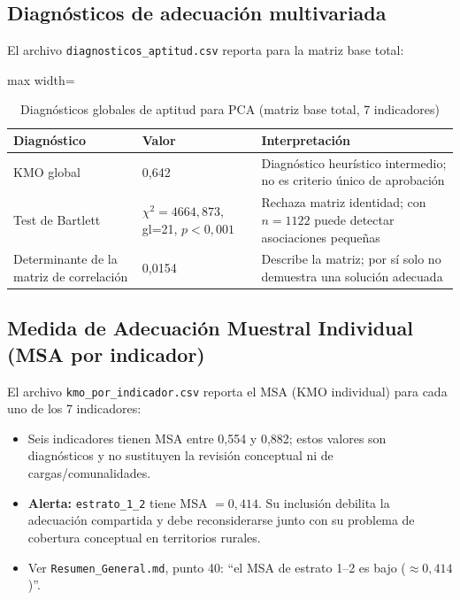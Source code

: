 \subsection{Diagnósticos de adecuación multivariada}
\label{sec:diagnosticos_aptitud}

El archivo \texttt{diagnosticos\_aptitud.csv} reporta para la matriz base total:

\begin{table}[htbp]
\centering
\caption{Diagnósticos globales de aptitud para PCA (matriz base total, 7 indicadores)}
\label{tab:diagnosticos_aptitud}
\begin{adjustbox}{max width=\textwidth}
\begin{tabular}{@{}lll@{}}
\toprule
\textbf{Diagnóstico} & \textbf{Valor} & \textbf{Interpretación} \\
\midrule
KMO global & 0,642 & Diagnóstico heurístico intermedio; no es criterio único de aprobación \\
Test de Bartlett & $\chi^2 = 4664,873$, gl=21, $p < 0,001$ & Rechaza matriz identidad; con $n=1122$ puede detectar asociaciones pequeñas \\
Determinante de la matriz de correlación & 0,0154 & Describe la matriz; por sí solo no demuestra una solución adecuada \\
\bottomrule
\end{tabular}
\end{adjustbox}
\end{table}

\subsection{Medida de Adecuación Muestral Individual (MSA por indicador)}
\label{sec:msa_individual}

El archivo \texttt{kmo\_por\_indicador.csv} reporta el MSA (KMO individual) para cada uno de los 7 indicadores:

\begin{itemize}
    \item Seis indicadores tienen MSA entre 0,554 y 0,882; estos valores son diagnósticos y no sustituyen la revisión conceptual ni de cargas/comunalidades.
    \item \textbf{Alerta:} \texttt{estrato\_1\_2} tiene MSA $=0,414$. Su inclusión debilita la adecuación compartida y debe reconsiderarse junto con su problema de cobertura conceptual en territorios rurales.
    \item Ver \texttt{Resumen\_General.md}, punto 40: ``el MSA de estrato 1--2 es bajo ($\approx 0,414$)''.
\end{itemize}


